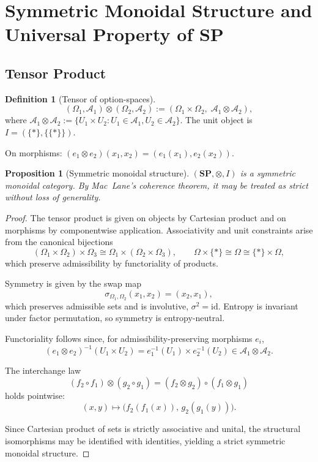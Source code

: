\documentclass[12pt,a4paper]{article}
\newtheorem{proposition}[theorem]{Proposition}
\theoremstyle{definition}
\newtheorem{definition}[theorem]{Definition}
\theoremstyle{remark}
\newcommand{\SP}{\mathbf{SP}}
\providecommand{\id}{\mathrm{id}}
\renewcommand{\id}{\mathrm{id}}
\newcommand{\tensor}{\otimes}
\newcommand{\unit}{I}
\begin{document}
\section{Symmetric Monoidal Structure and Universal Property of \texorpdfstring{$\SP$}{SP}}
\label{sec:monoidal}

\subsection{Tensor Product}

\begin{definition}[Tensor of option-spaces]
\label{def:tensor}
\[
  (\Omega_1,\mathcal{A}_1)\tensor(\Omega_2,\mathcal{A}_2)
  := (\Omega_1\times\Omega_2,\;\mathcal{A}_1\tensor\mathcal{A}_2),
\]
where $\mathcal{A}_1\tensor\mathcal{A}_2:=\{U_1\times U_2:U_1\in\mathcal{A}_1,
U_2\in\mathcal{A}_2\}$. The unit object is $\unit=(\{*\},\{\{*\}\})$.

On morphisms: $(e_1\tensor e_2)(x_1,x_2)=(e_1(x_1),e_2(x_2))$.
\end{definition}

\begin{proposition}[Symmetric monoidal structure]
\label{prop:monoidal}
$(\SP,\tensor,\unit)$ is a symmetric monoidal category. By Mac~Lane's
coherence theorem, it may be treated as strict without loss of generality.
\end{proposition}

\begin{proof}
The tensor product is given on objects by Cartesian product and on
morphisms by componentwise application. Associativity and unit
constraints arise from the canonical bijections
\[
(\Omega_1\times\Omega_2)\times\Omega_3
\cong
\Omega_1\times(\Omega_2\times\Omega_3),
\qquad
\Omega\times\{*\}\cong\Omega\cong\{*\}\times\Omega,
\]
which preserve admissibility by functoriality of products.

Symmetry is given by the swap map
\[
\sigma_{\Omega_1,\Omega_2}(x_1,x_2)=(x_2,x_1),
\]
which preserves admissible sets and is involutive, $\sigma^2=\id$.
Entropy is invariant under factor permutation, so symmetry is
entropy-neutral.

Functoriality follows since, for admissibility-preserving morphisms
$e_i$,
\[
(e_1\tensor e_2)^{-1}(U_1\times U_2)
=
e_1^{-1}(U_1)\times e_2^{-1}(U_2)
\in \mathcal{A}_1\tensor\mathcal{A}_2.
\]

The interchange law
\[
(f_2\circ f_1)\tensor(g_2\circ g_1)
=
(f_2\tensor g_2)\circ(f_1\tensor g_1)
\]
holds pointwise:
\[
(x,y)\mapsto
\bigl(f_2(f_1(x)),\,g_2(g_1(y))\bigr).
\]

Since Cartesian product of sets is strictly associative and unital,
the structural isomorphisms may be identified with identities, yielding
a strict symmetric monoidal structure.
\end{proof}
\end{document}
